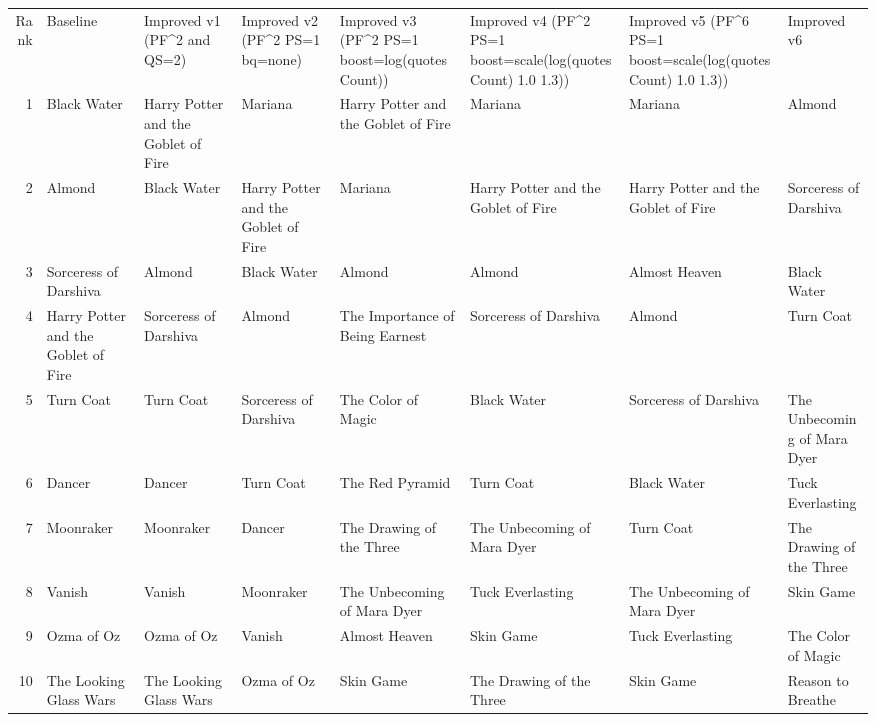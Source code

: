 \begin{tabular}{rlllllll}
Rank & Baseline & Improved v1 (PF^2 and QS=2) & Improved v2 (PF^2 PS=1 bq=none) & Improved v3 (PF^2 PS=1 boost=log(quotesCount)) & Improved v4 (PF^2 PS=1 boost=scale(log(quotesCount) 1.0 1.3)) & Improved v5 (PF^6 PS=1 boost=scale(log(quotesCount) 1.0 1.3)) & Improved v6 \\
1 & Black Water & Harry Potter and the Goblet of Fire & Mariana & Harry Potter and the Goblet of Fire & Mariana & Mariana & Almond \\
2 & Almond & Black Water & Harry Potter and the Goblet of Fire & Mariana & Harry Potter and the Goblet of Fire & Harry Potter and the Goblet of Fire & Sorceress of Darshiva \\
3 & Sorceress of Darshiva & Almond & Black Water & Almond & Almond & Almost Heaven & Black Water \\
4 & Harry Potter and the Goblet of Fire & Sorceress of Darshiva & Almond & The Importance of Being Earnest & Sorceress of Darshiva & Almond & Turn Coat \\
5 & Turn Coat & Turn Coat & Sorceress of Darshiva & The Color of Magic & Black Water & Sorceress of Darshiva & The Unbecoming of Mara Dyer \\
6 & Dancer & Dancer & Turn Coat & The Red Pyramid & Turn Coat & Black Water & Tuck Everlasting \\
7 & Moonraker & Moonraker & Dancer & The Drawing of the Three & The Unbecoming of Mara Dyer & Turn Coat & The Drawing of the Three \\
8 & Vanish & Vanish & Moonraker & The Unbecoming of Mara Dyer & Tuck Everlasting & The Unbecoming of Mara Dyer & Skin Game \\
9 & Ozma of Oz & Ozma of Oz & Vanish & Almost Heaven & Skin Game & Tuck Everlasting & The Color of Magic \\
10 & The Looking Glass Wars & The Looking Glass Wars & Ozma of Oz & Skin Game & The Drawing of the Three & Skin Game & Reason to Breathe \\
\end{tabular}
